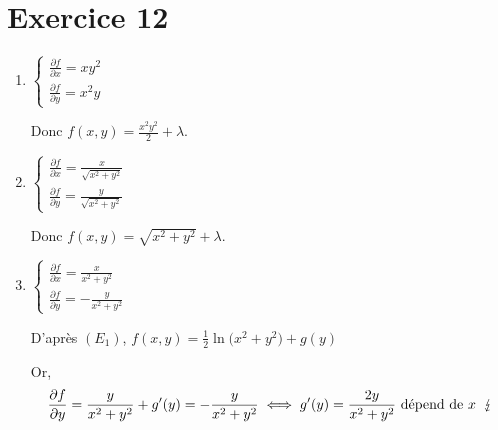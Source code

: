 \part{Exercice 12}

\begin{enumerate}
	\item $\begin{cases}
			\frac{\partial f}{\partial x} = xy^2\\[2mm]
			\frac{\partial f}{\partial y} = x^2 y
		\end{cases}$ 

		Donc $f(x,y) = \frac{x^2y^2}{2} + \lambda$.
	\item $\begin{cases}
			\frac{\partial f}{\partial x} = \frac{x}{\sqrt{x^2+y^2}}\\[2mm]
			\frac{\partial f}{\partial y} = \frac{y}{\sqrt{x^2 + y^2}}
		\end{cases}$ 

		Donc $f(x,y) = \sqrt{x^2 + y^2} + \lambda$.
	\item $\begin{cases}
			\frac{\partial f}{\partial x} = \frac{x}{x^2 + y^2}\\[2mm]
			\frac{\partial f}{\partial y} = -\frac{y}{x^2 + y^2}
		\end{cases}$ 

		D'après $(E_1)$,  $f(x,y) = \frac{1}{2} \ln\big(x^2 + y^2\big) + g(y)$

		Or, 
		\[
			\frac{\partial f}{\partial y} = \frac{y}{x^2 + y^2} + g'(y) = -\frac{y}{x^2 + y^2}
			\iff g'(y) = \frac{2y}{x^2 + y^2} \text{ dépend de $x$}\kern 2mm \lightning
		\] 
\end{enumerate}

